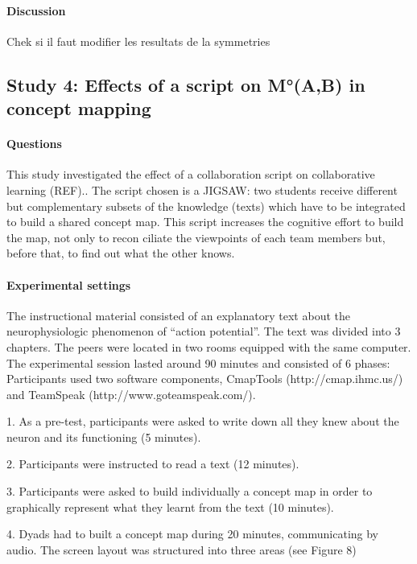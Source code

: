 \documentclass[twocolumn]{article}
\begin{document}
\paragraph{Discussion}

Chek si il faut modifier les resultats de la symmetries

\subsection{Study 4:  Effects of a script on M°(A,B)  in concept mapping}

\paragraph{Questions}

This study investigated the effect of a collaboration script on collaborative
learning (REF).. The script chosen is a JIGSAW: two students receive different
but complementary subsets of the knowledge (texts) which have to be integrated
to build a shared concept map.  This script increases the cognitive effort to
build the map, not only to recon ciliate the viewpoints of each team members
but, before that, to find out what the other knows. 

\paragraph{Experimental settings}

The instructional material consisted of an explanatory text about the
neurophysiologic phenomenon of “action potential”. The text was divided into 3
chapters. The peers were located in two rooms equipped with the same computer.
The experimental session lasted around 90 minutes and consisted of 6 phases:
Participants used two software components, CmapTools (http://cmap.ihmc.us/) and
TeamSpeak (http://www.goteamspeak.com/).

1. As a pre-test, participants were asked to write down all they knew about the
neuron and its functioning (5 minutes).

2. Participants were instructed to read a text (12 minutes). 

3. Participants were asked to build individually a concept map in order to
graphically represent what they learnt from the text (10 minutes). 

4. Dyads had to built a concept map during 20 minutes, communicating by audio.
The screen layout was structured into three areas (see Figure 8) 
\end{document}

